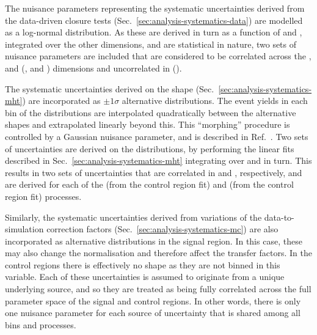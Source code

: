 The nuisance parameters representing the systematic uncertainties derived from 
the data-driven closure tests (Sec.~\ref{sec:analysis-systematics-data}) %
are modelled as a log-normal distribution. As these are derived in turn as a 
function of \njet and \scalht, integrated over the other dimensions, and are 
statistical in nature, two sets of nuisance parameters are included that are 
considered to be correlated across the \nb, 
\scalht and \mht (\njet, \nb and \mht) dimensions and uncorrelated in \njet 
(\scalht). 

The systematic uncertainties derived on the \mht shape 
(Sec.~\ref{sec:analysis-systematics-mht}) are incorporated as $\pm1\sigma$ 
alternative \mht distributions. The event yields in each bin of the 
distributions are interpolated quadratically between the alternative shapes and 
extrapolated linearly beyond this. This ``morphing'' procedure is controlled by 
a Gaussian nuisance parameter, and is described in Ref.~\cite{templatemorphing}.
Two sets of uncertainties are derived on the \mht distributions, by performing 
the linear fits described in Sec.~\ref{sec:analysis-systematics-mht} 
integrating over \scalht and \njet in turn. This results in two sets of  
uncertainties that are correlated in \scalht and \njet, respectively, and are 
derived for each of the \znnj (from the \mmj control region fit) and \wlj (from 
the \mj control region fit) processes.

Similarly, the systematic uncertainties derived from variations of the 
data-to-simulation correction factors (Sec.~\ref{sec:analysis-systematics-mc}) 
are also incorporated as alternative \mht distributions in the signal region. 
In this case, these may also change the \mht normalisation and therefore affect 
the transfer factors. In the control regions there is effectively no \mht shape 
as they are not binned in this variable.
Each of these uncertainties is assumed to originate from a unique 
underlying source, and so they are treated as being fully correlated across the 
full parameter space of the signal and control regions. In other words, there 
is only one nuisance parameter for each source of uncertainty that is shared 
among all bins and processes.


